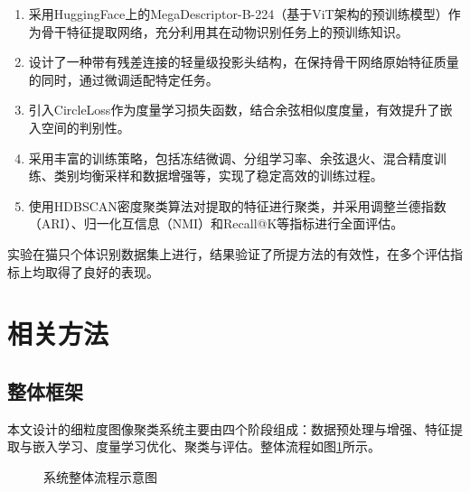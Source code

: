 \documentclass[a4paper]{article}
\begin{document}
\begin{enumerate}
    \item 采用HuggingFace上的MegaDescriptor-B-224（基于ViT架构的预训练模型）作为骨干特征提取网络，充分利用其在动物识别任务上的预训练知识。
    \item 设计了一种带有残差连接的轻量级投影头结构，在保持骨干网络原始特征质量的同时，通过微调适配特定任务。
    \item 引入CircleLoss作为度量学习损失函数，结合余弦相似度度量，有效提升了嵌入空间的判别性。
    \item 采用丰富的训练策略，包括冻结微调、分组学习率、余弦退火、混合精度训练、类别均衡采样和数据增强等，实现了稳定高效的训练过程。
    \item 使用HDBSCAN密度聚类算法对提取的特征进行聚类，并采用调整兰德指数（ARI）、归一化互信息（NMI）和Recall@K等指标进行全面评估。
\end{enumerate}

实验在猫只个体识别数据集上进行，结果验证了所提方法的有效性，在多个评估指标上均取得了良好的表现。

\section{相关方法}
\label{sec:method}

\subsection{整体框架}

本文设计的细粒度图像聚类系统主要由四个阶段组成：数据预处理与增强、特征提取与嵌入学习、度量学习优化、聚类与评估。整体流程如图\ref{fig:pipeline}所示。

\begin{figure}[htbp]
\centering
{}
\caption{系统整体流程示意图}
\label{fig:pipeline}
\end{figure}
\end{document}
